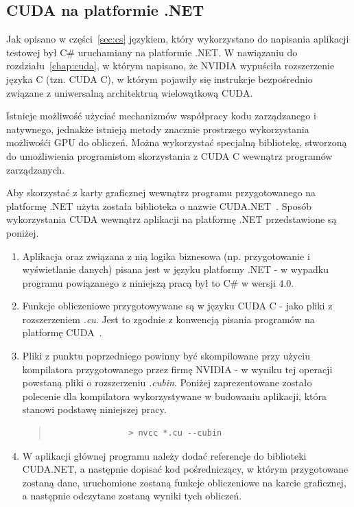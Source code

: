 \subsection{CUDA na platformie .NET}
Jak opisano w części~\ref{sec:cs} językiem, który wykorzystano do napisania aplikacji testowej był C\# uruchamiany na platformie .NET. W nawiązaniu do rozdziału~\ref{chap:cuda}, w którym napisano, że NVIDIA wypuściła rozszerzenie języka C (tzn. CUDA C), w którym pojawiły się instrukcje bezpośrednio związane z uniwersalną architektruą wielowątkową CUDA.

Istnieje możliwość użyciać mechanizmów współpracy kodu zarządzanego i natywnego, jednakże istnieją metody znacznie prostrzego wykorzystania możliwośći GPU do obliczeń. Można wykorzystać specjalną bibliotekę, stworzoną do umożliwienia programistom skorzystania z CUDA C wewnątrz programów zarządzanych.

Aby skorzystać z karty graficznej wewnątrz programu przygotowanego na platformę .NET użyta została biblioteka o nazwie CUDA.NET~\cite{cuda:net}. Sposób wykorzystania CUDA wewnątrz aplikacji na platformę .NET przedstawione są poniżej.

\begin{enumerate}
	\item Aplikacja oraz związana z nią logika biznesowa (np. przygotowanie i wyświetlanie danych) pisana jest w języku platformy .NET - w wypadku programu powiązanego z niniejszą pracą był to C\# w wersji $4.0$.
	\item Funkcje obliczeniowe przygotowywane są w języku CUDA C - jako pliki z rozszerzeniem \emph{.cu}. Jest to zgodnie z konwencją pisania programów na platformę CUDA~\cite{Cuda:PGuide}.
	\item Pliki z punktu poprzedniego powinny być skompilowane przy użyciu kompilatora przygotowanego przez firmę NVIDIA - w wyniku tej operacji powstaną pliki o rozszerzeniu \emph{.cubin}. Poniżej zaprezentowane zostało polecenie dla kompilatora wykorzystywane w budowaniu aplikacji, która stanowi podstawę niniejszej pracy.
		\begin{quote}
			\begin{verbatim}
				> nvcc *.cu --cubin
			\end{verbatim}
		\end{quote}
	\item W aplikacji głównej programu należy dodać referencje do biblioteki CUDA.NET, a następnie dopisać kod pośredniczący, w którym przygotowane zostaną dane, uruchomione zostaną funkcje obliczeniowe na karcie graficznej, a następnie odczytane zostaną wyniki tych obliczeń.
\end{enumerate}

